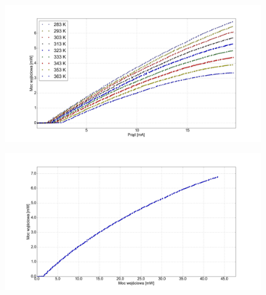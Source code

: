 \documentclass[xcolor={dvipsnames,table}]{beamer}
\begin{document}
\begin{frame}
\center
\begin{figure}
   \includegraphics[width=1.10\textwidth,natwidth=69,natheight=87]{plot_all.png}
\end{figure}

\end{frame}


\begin{frame}
\center
\begin{figure}
   \includegraphics[width=1.10\textwidth,natwidth=69,natheight=87]{temp_10_power.png}
\end{figure}

\end{frame}
\end{document}
